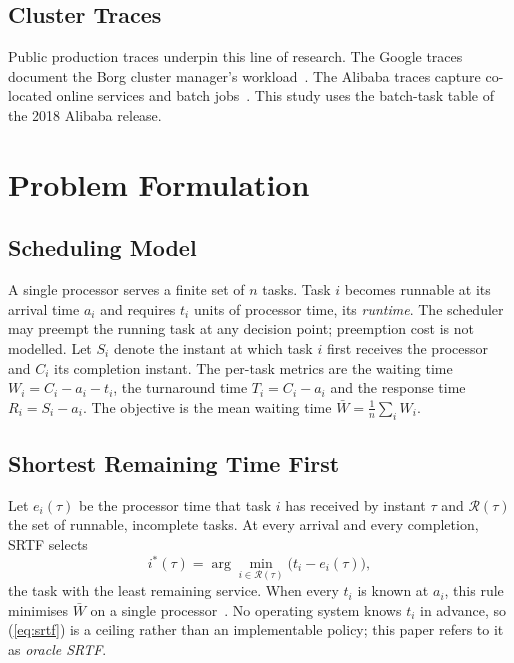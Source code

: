 \documentclass[conference]{IEEEtran}
\begin{document}
\subsection{Cluster Traces}
Public production traces underpin this line of research. The Google
traces~\cite{reiss_google_2011,chen_analysis_2010,reiss_heterogeneity_2012,liu_characterizing_2012}
document the Borg cluster manager's workload~\cite{verma_large_2015}. The
Alibaba traces capture co-located online services and batch
jobs~\cite{lu_imbalance_2017,cheng_characterizing_2018,cheng_analyzing_2018,liu_elasticity_2018,unknown_characterizing_2020}.
This study uses the batch-task table of the 2018 Alibaba release.

\section{Problem Formulation}
\label{sec:problem}

\subsection{Scheduling Model}
A single processor serves a finite set of $n$ tasks. Task $i$ becomes runnable
at its arrival time $a_i$ and requires $t_i$ units of processor time, its
\emph{runtime}. The scheduler may preempt the running task at any decision
point; preemption cost is not modelled. Let $S_i$ denote the instant at which
task $i$ first receives the processor and $C_i$ its completion instant. The
per-task metrics are the waiting time $W_i = C_i - a_i - t_i$, the turnaround
time $T_i = C_i - a_i$ and the response time $R_i = S_i - a_i$. The objective
is the mean waiting time $\bar{W} = \frac{1}{n}\sum_{i} W_i$.

\subsection{Shortest Remaining Time First}
Let $e_i(\tau)$ be the processor time that task $i$ has received by instant
$\tau$ and $\mathcal{R}(\tau)$ the set of runnable, incomplete tasks. At every
arrival and every completion, SRTF selects
\begin{equation}
  i^{*}(\tau) = \arg\min_{i \in \mathcal{R}(\tau)} \bigl( t_i - e_i(\tau) \bigr),
  \label{eq:srtf}
\end{equation}
the task with the least remaining service. When every $t_i$ is known at
$a_i$, this rule minimises $\bar{W}$ on a single
processor~\cite{schrage_optimality_1968}. No operating system knows $t_i$ in advance,
so (\ref{eq:srtf}) is a ceiling rather than an implementable policy; this
paper refers to it as \emph{oracle SRTF}.
\end{document}
